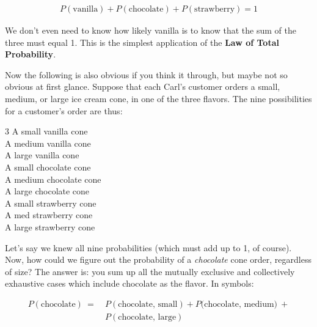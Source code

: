 \vspace{-.2in}
\begin{align*}
P(\textrm{vanilla}) + P(\textrm{chocolate}) + P(\textrm{strawberry}) = 1
\end{align*}
\vspace{-.2in}

We don't even need to know how likely vanilla is to know that the sum of the
three must equal 1. This is the simplest application of the \textbf{Law of
Total Probability}.

Now the following is also obvious if you think it through, but maybe not so
obvious at first glance. Suppose that each Carl's customer orders a small,
medium, or large ice cream cone, in one of the three flavors. The nine
possibilities for a customer's order are thus:

\vspace{-.1in}
\begin{center}
\begin{multicols}{3}
\scriptsize
A small vanilla cone \\
A medium vanilla cone \\
A large vanilla cone \\
\columnbreak
A small chocolate cone \\
A medium chocolate cone \\
A large chocolate cone \\
\columnbreak
A small strawberry cone \\
A med strawberry cone \\
A large strawberry cone \\
\end{multicols}
\end{center}
\vspace{-.1in}

Let's say we knew all nine probabilities (which must add up to 1, of course).
Now, how could we figure out the probability of a \textit{chocolate} cone
order, regardless of size? The answer is: you sum up all the mutually exclusive
and collectively exhaustive cases which include chocolate as the flavor. In
symbols:

\vspace{-.2in}
\begin{align*}
P(\textrm{chocolate})\ =\ & P(\textrm{chocolate, small}) + P(\textrm{chocolate,
medium)}\ +\\& P(\textrm{chocolate, large})
\end{align*}
\vspace{-.2in}

